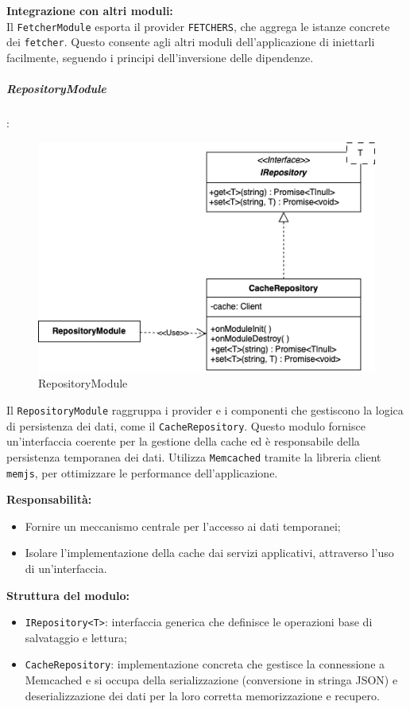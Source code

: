 \textbf{Integrazione con altri moduli:} \\
Il \texttt{FetcherModule} esporta il provider \texttt{FETCHERS}, che aggrega le istanze concrete dei \texttt{fetcher}. Questo consente agli altri moduli dell’applicazione di iniettarli facilmente, seguendo i principi dell’inversione delle dipendenze.

\subparagraph{RepositoryModule}:

\begin{figure}[H] 
    \centering
    \includegraphics[scale = 0.5]{template/images/uml_back/RepositoryModule.png}
    \caption{RepositoryModule}
\end{figure}

Il \texttt{RepositoryModule} raggruppa i provider e i componenti che gestiscono la logica di persistenza dei dati, come il \texttt{CacheRepository}. Questo modulo fornisce un'interfaccia coerente per la gestione della cache ed è responsabile della persistenza temporanea dei dati. Utilizza \texttt{Memcached} tramite la libreria client \texttt{memjs}, per ottimizzare le performance dell'applicazione.

\textbf{Responsabilità:}
\begin{itemize}
    \item Fornire un meccanismo centrale per l’accesso ai dati temporanei;
    \item Isolare l’implementazione della cache dai servizi applicativi, attraverso l’uso di un’interfaccia.
\end{itemize}

\textbf{Struttura del modulo:}
\begin{itemize}
    \item \texttt{IRepository<T>}: interfaccia generica che definisce le operazioni base di salvataggio e lettura;
    \item \texttt{CacheRepository}: implementazione concreta che gestisce la connessione a Memcached e si occupa della serializzazione (conversione in stringa JSON) e deserializzazione dei dati per la loro corretta memorizzazione e recupero.
\end{itemize}

